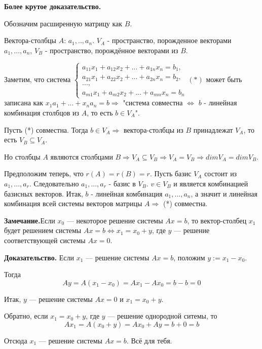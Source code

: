 \documentclass[a4paper]{article}
\begin{document}
\begin{hproof}
\textbf{Более крутое доказательство.}

Обозначим расширенную матрицу как $B$.

Вектора-столбцы $A$: $a_1,.., a_n$. $V_A$ - пространство, порожденное векторами $a_1, ..., a_n$, $V_B$ - пространство, порождённое векторами из $B$.

Заметим, что система $\begin{cases}
a_{11}x_1 + a_{12}x_2 + ... + a_{1n}x_n = b_1,
\\
a_{21}x_1 + a_{22}x_2 + ... + a_{2n}x_n = b_2,
\\
...,
\\
a_{m1}x_1 + a_{m2}x_2 + ... + a_{mn}x_n = b_n

\end{cases} (*)$ может быть записана как $x_1a_1 + ... + x_na_n = b \Rightarrow$ "система совместна $\Leftrightarrow$ $b$ - линейная комбинация столбцов из $A$, то есть $b \in V_A$".

Пусть (*) совместна. Тогда $b \in V_A \Rightarrow$ вектора-столбцы из $B$ принадлежат $V_A$, то есть $V_B \subseteq V_A$.

Но столбцы $A$ являются столбцами $B \Rightarrow V_A \subseteq V_B \Rightarrow V_A = V_B \Rightarrow dimV_A = dimV_B$.

Предположим теперь, что $r(A) = r(B) = r$. Пусть базис $V_A$ состоит из $a_1, ..., a_r$. Следовательно $a_1, ..., a_r$ - базис в $V_B$. $v \in V_B$ и является комбинацией базисных векторов. Итак, $b$ - линейная комбинация $a_1, ..., a_n$, а значит и линейная комбинация всей системы векторов матрицы $A \Rightarrow$ (*) совместна.
\end{hproof}


\begin{htheorem}
\textbf{Замечание.}Если $x_0$ --- некоторое решение системы $Ax = b$, то вектор-столбец $x_1$ будет решением системы $Ax=b \Leftrightarrow x_1 = x_0 + y$, где $y$ --- решение соответствующей системы $Ax = 0$.
\end{htheorem}

\begin{hproof}
\textbf{Доказательство.} Если $x_1$ --- решение системы $Ax=b$, положим $y:=x_1-x_0$.

Тогда \begin{equation}
Ay = A(x_1-x_0) = Ax_1-Ax_0 = b-b=0
\end{equation}

Итак, $y$ --- решение системы $Ax=0$ и $x_1=x_0+y$.

Обратно, если $x_1=x_0+y$, где $y$ --- решение однородной ситемы, то \begin{equation}
Ax_1 = A(x_0+y) = Ax_0+Ay=b+0=b
\end{equation}

Отсюда $x_1$ --- решение системы $Ax = b$. Всё для тебя.
\end{hproof}
\end{document}

